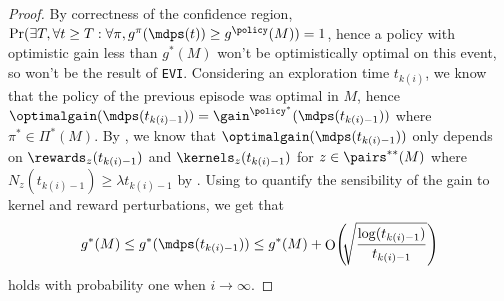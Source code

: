 \documentclass[preprint,cleveref,12pt]{colt2025}
\DeclarePairedDelimiter{\parens}{(}{)}	%
\DeclareMathOperator*{\OH}{\mathrm{O}}
\def\models{\mdps}
\def\optgain{\optimalgain} %
\begin{document}
    \begin{proof}
        By correctness of the confidence region, $\Pr(\exists T, \forall t \ge T: \forall \pi, g^\pi(\models(t)) \ge g^\policy(M)) = 1$, hence a policy with optimistic gain less than $g^*(M)$ won't be optimistically optimal on this event, so won't be the result of \texttt{EVI}.
        Considering an exploration time $t_{k(i)}$, we know that the policy of the previous episode was optimal in $M$, hence $\optgain(\models(t_{k(i)-1})) = \gain^{\policy^*}(\models(t_{k(i)-1}))$ where $\pi^* \in \Pi^*(M)$.
        By , we know that $\optgain(\models(t_{k(i)-1}))$ only depends on $\rewards_z(t_{k(i)-1})$ and $\kernels_z(t_{k(i)-1})$ for $z \in \pairs^{**}(M)$ where $N_z(t_{k(i)-1}) \ge \lambda t_{k(i)-1}$ by .
        Using  to quantify the sensibility of the gain to kernel and reward perturbations, we get that
        \begin{equation}
        \label{equation_at_exploitation_episodes}
            g^*(M) 
            \le
            g^*(\models(t_{k(i)-1}))
            \le 
            g^*(M) 
            + \OH \parens*{ \!\! \sqrt{ \frac{\log(t_{k(i)-1})}{t_{k(i)-1}} } }
        \end{equation}
        holds with probability one when $i \to \infty$.


\end{proof}
\end{document}
